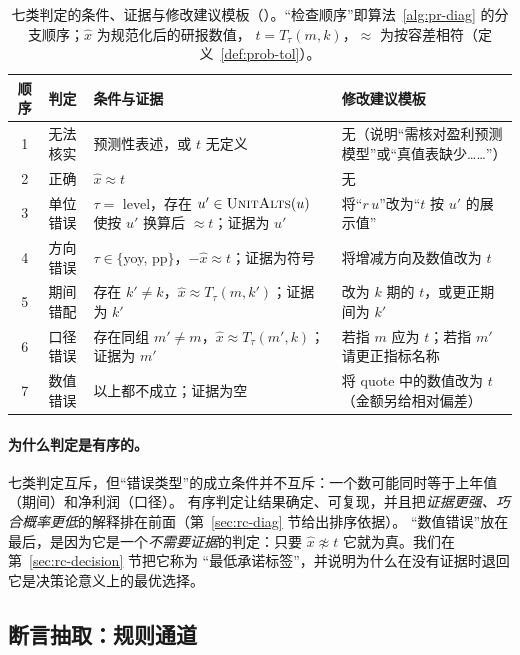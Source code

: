 \begin{table}[t]
\centering
\caption{七类判定的条件、证据与修改建议模板（）。“检查顺序”即算法~\ref{alg:pr-diag} 的分支顺序；$\hat x$ 为规范化后的研报数值，
$t=T_\tau(m,k)$，$\approx$ 为按容差相符（定义~\ref{def:prob-tol}）。}
\label{tab:rc-verdicts}
\small
\begin{tabularx}{\linewidth}{@{}c p{1.5cm} p{4.0cm} X@{}}
\toprule
顺序 & 判定 & 条件与证据 & 修改建议模板 \\
\midrule
1 & 无法核实 & 预测性表述，或 $t$ 无定义 & 无（说明“需核对盈利预测模型”或“真值表缺少……”） \\
2 & 正确 & $\hat x\approx t$ & 无 \\
3 & 单位错误 & $\tau=$ level，存在 $u'\in\textsc{UnitAlts}(u)$ 使按 $u'$ 换算后 $\approx t$；证据为 $u'$ & 将“$r\,u$”改为“$t$ 按 $u'$ 的展示值” \\
4 & 方向错误 & $\tau\in\{$yoy, pp$\}$，$-\hat x\approx t$；证据为符号 & 将增减方向及数值改为 $t$ \\
5 & 期间错配 & 存在 $k'\ne k$，$\hat x\approx T_\tau(m,k')$；证据为 $k'$ & 改为 $k$ 期的 $t$，或更正期间为 $k'$ \\
6 & 口径错误 & 存在同组 $m'\ne m$，$\hat x\approx T_\tau(m',k)$；证据为 $m'$ & 若指 $m$ 应为 $t$；若指 $m'$ 请更正指标名称 \\
7 & 数值错误 & 以上都不成立；证据为空 & 将 quote 中的数值改为 $t$（金额另给相对偏差） \\
\bottomrule
\end{tabularx}
\end{table}

\paragraph{为什么判定是有序的。}七类判定互斥，但“错误类型”的成立条件并不互斥：一个数可能同时等于上年值（期间）和净利润（口径）。
有序判定让结果确定、可复现，并且把\emph{证据更强、巧合概率更低}的解释排在前面（第~\ref{sec:rc-diag} 节给出排序依据）。
“数值错误”放在最后，是因为它是一个\emph{不需要证据}的判定：只要 $\hat x\not\approx t$ 它就为真。我们在第~\ref{sec:rc-decision} 节把它称为
“最低承诺标签”，并说明为什么在没有证据时退回它是决策论意义上的最优选择。

\subsection{断言抽取：规则通道}
\label{sec:rc-rule}

